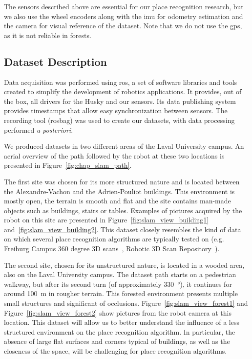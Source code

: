 The sensors described above are essential for our place recognition research, but we also use the wheel encoders along with the \gls*{imu} for odometry estimation and the camera for visual reference of the dataset. Note that we do not use the \gls*{gps}, as it is not reliable in forests. 


\subsection{Dataset Description}
\label{ssec:chap_slam_platform}

Data acquisition was performed using \gls*{ros}, a set of software libraries and tools created to simplify the development of robotics applications. It provides, out of the box, all drivers for the Husky and our sensors. Its data publishing system provides timestamps that allow easy synchronization between sensors. The recording tool (rosbag) was used to create our datasets, with data processing performed \textit{a posteriori}.

We produced datasets in two different areas of the Laval University campus. An aerial overview of the path followed by the robot at these two locations is presented in Figure~\ref{fig:chap_slam_path}.

The first site was chosen for its more structured nature and is located between the Alexandre-Vachon and the Adrien-Pouliot buildings. This environment is mostly open, the terrain is smooth and flat and the site contains man-made objects such as buildings, stairs or tables. Examples of pictures acquired by the robot on this site are presented in Figure~\ref{fig:slam_view_building1} and~\ref{fig:slam_view_building2}. This dataset closely resembles the kind of data on which several place recognition algorithms are typically tested on (e.g. Freiburg Campus 360 degree 3D scans~\citep{FreiburgDataset}, Robotic 3D Scan Repository~\citep{Datasets}).

The second site, chosen for its unstructured nature, is located in a wooded area, also on the Laval University campus. The dataset path starts on a pedestrian walkway, but after its second turn (of approximately \SI{330}{\degree}), it continues for around \SI{100}{\meter} in rougher terrain. This forested environment presents multiple small structures and significant of occlusions. Figure~\ref{fig:slam_view_forest1} and Figure~\ref{fig:slam_view_forest2} show pictures from the robot camera at this location. This dataset will allow us to better understand the influence of a less structured environment on the place recognition algorithm. In particular, the absence of large flat surfaces and corners typical of buildings, as well as the closeness of the space, will be challenging for place recognition algorithms.

